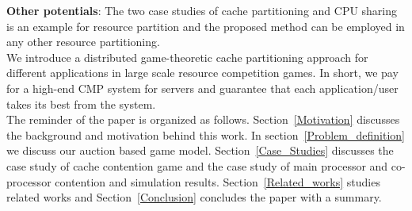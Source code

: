 \indent \textbf{Other potentials}: The two case studies of cache partitioning and CPU sharing is an example for resource partition and the proposed method can be employed in any other resource partitioning. \\
\indent We introduce a distributed game-theoretic cache partitioning approach for different applications in large scale resource competition games.  In short, we pay for a high-end CMP system for servers and guarantee that each application/user takes its best from the system.\\ 
\indent The reminder of the paper is organized as follows. Section~\ref{Motivation} discusses the background and motivation behind this work. In section~\ref{Problem_definition} we discuss our auction based game model. Section~\ref{Case_Studies} discusses the case study of cache contention game and the case study of main processor and co-processor contention and simulation results. Section~\ref{Related_works} studies related works and Section~\ref{Conclusion} concludes the paper with a summary.
